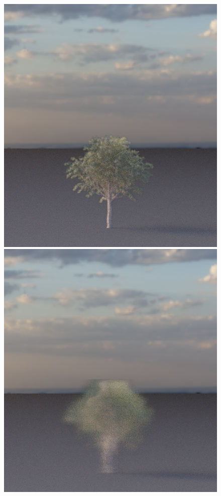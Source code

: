 \begin{figure}[t]
\begin{center}
\begin{minipage}[c]{0.24\textwidth}
            \includegraphics[valign=c, width=\linewidth]{img/EU06m_0.1.png}
        \end{minipage}
        \begin{minipage}[c]{0.24\textwidth}
            \includegraphics[valign=c, width=\linewidth]{img/EU06m_0.8.png}
        \end{minipage}
    

\end{center}
\end{figure}
